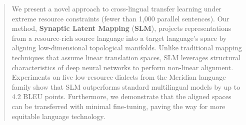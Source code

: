 \documentclass[10pt,twocolumn]{article}
\begin{document}

\begin{abstract}
We present a novel approach to cross-lingual transfer learning under extreme resource constraints (fewer than 1,000 parallel sentences). Our method, \textbf{Synaptic Latent Mapping} (\textbf{SLM}), projects representations from a resource-rich source language into a target language's space by aligning low-dimensional topological manifolds. Unlike traditional mapping techniques that assume linear translation spaces, SLM leverages structural characteristics of deep neural networks to perform non-linear alignment. Experiments on five low-resource dialects from the Meridian language family show that SLM outperforms standard multilingual models by up to 4.2 BLEU points. Furthermore, we demonstrate that the aligned spaces can be transferred with minimal fine-tuning, paving the way for more equitable language technology.
\end{abstract}








\end{document}
